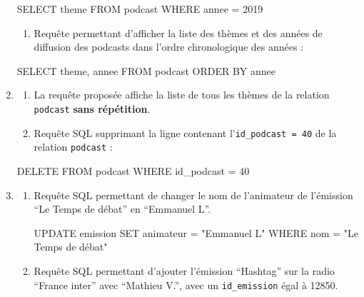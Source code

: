 \documentclass[
  letterpaper,
  DIV=11,
  numbers=noendperiod]{scrartcl}
\newenvironment{Shaded}{\begin{snugshade}}{\end{snugshade}}
\newcommand{\DecValTok}[1]{\textcolor[rgb]{0.68,0.00,0.00}{#1}}
\newcommand{\KeywordTok}[1]{\textcolor[rgb]{0.00,0.23,0.31}{#1}}
\newcommand{\NormalTok}[1]{\textcolor[rgb]{0.00,0.23,0.31}{#1}}
\newcommand{\OperatorTok}[1]{\textcolor[rgb]{0.37,0.37,0.37}{#1}}
\newcommand{\OtherTok}[1]{\textcolor[rgb]{0.00,0.23,0.31}{#1}}
\providecommand{\tightlist}{%
  \setlength{\itemsep}{0pt}\setlength{\parskip}{0pt}}\usepackage{longtable,booktabs,array}
\begin{document}
\begin{enumerate}
\begin{Shaded}
\begin{Highlighting}[]
\KeywordTok{SELECT}\NormalTok{ theme}
\KeywordTok{FROM}\NormalTok{ podcast}
\KeywordTok{WHERE}\NormalTok{ annee }\OperatorTok{=} \DecValTok{2019}
\end{Highlighting}
\end{Shaded}

  \begin{enumerate}
  \def\labelenumii{\alph{enumii}.}
  \setcounter{enumii}{2}
  \tightlist
  \item
    Requête permettant d'afficher la liste des thèmes et des années de
    diffusion des podcasts dans l'ordre chronologique des années :
  \end{enumerate}

\begin{Shaded}
\begin{Highlighting}[]
\KeywordTok{SELECT}\NormalTok{ theme, annee}
\KeywordTok{FROM}\NormalTok{ podcast}
\KeywordTok{ORDER} \KeywordTok{BY}\NormalTok{ annee}
\end{Highlighting}
\end{Shaded}
\item
  \begin{enumerate}
  \def\labelenumii{\alph{enumii}.}
  \item
    La requête proposée affiche la liste de tous les thèmes de la
    relation \texttt{podcast} \textbf{sans répétition}.
  \item
    Requête SQL supprimant la ligne contenant
    l'\texttt{id\_podcast\ =\ 40} de la relation \texttt{podcast} :
  \end{enumerate}

\begin{Shaded}
\begin{Highlighting}[]
\KeywordTok{DELETE} \KeywordTok{FROM}\NormalTok{ podcast}
\KeywordTok{WHERE}\NormalTok{ id\_podcast }\OperatorTok{=} \DecValTok{40}
\end{Highlighting}
\end{Shaded}
\item
  \begin{enumerate}
  \def\labelenumii{\alph{enumii}.}
  \item
    Requête SQL permettant de changer le nom de l'animateur de
    l'émission ``Le Temps de débat'' en ``Emmanuel L''.

\begin{Shaded}
\begin{Highlighting}[]
\KeywordTok{UPDATE}\NormalTok{ emission}
\KeywordTok{SET}\NormalTok{ animateur }\OperatorTok{=} \OtherTok{"Emmanuel L"}
\KeywordTok{WHERE}\NormalTok{ nom }\OperatorTok{=} \OtherTok{"Le Temps de débat"}
\end{Highlighting}
\end{Shaded}
  \item
    Requête SQL permettant d'ajouter l'émission ``Hashtag'' sur la radio
    ``France inter'' avec ``Mathieu V.'', avec un \texttt{id\_emission}
    égal à 12850.


\end{enumerate}
\end{enumerate}
\end{document}
